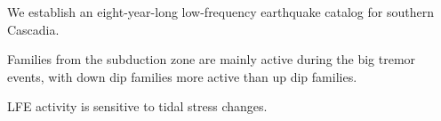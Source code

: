 \documentclass[draft]{agujournal2019}
\begin{document}



\begin{keypoints}
\item We establish an eight-year-long low-frequency earthquake catalog for southern Cascadia.
\item Families from the subduction zone are mainly active during the big tremor events, with down dip families more active than up dip families.
\item LFE activity is sensitive to tidal stress changes.
\end{keypoints}

%
%

\end{document}
